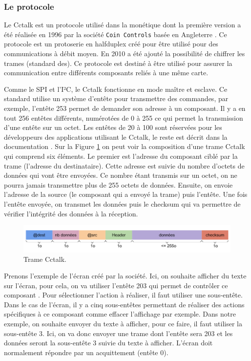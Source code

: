 \documentclass[a4paper]{article}
\begin{document}
\subsubsection{Le protocole}

Le Cctalk est un protocole utilisé dans la monétique dont la première version a
été réalisée en 1996 par la société \verb|Coin Controls| basée en Angleterre
\cite{cctalkpt1}. Ce protocole est un \gls{protoserie} en \gls{halfduplex} créé
pour être utilisé pour des communications à débit moyen. En 2010 a été ajouté la
possibilité de chiffrer les trames (standard \gls{des}). Ce protocole est
destiné à être utilisé pour assurer la communication entre différents composants
reliés à une même carte.

Comme le SPI et l'I²C, le Cctalk fonctionne en mode maître et esclave. Ce
standard utilise un système d'entête pour transmettre des commandes, par
exemple, l'entête 253 permet de demander son adresse à un composant. Il y a en
tout 256 entêtes différents, numérotées de 0 à 255 ce qui permet la
transmission d'une entête sur un octet. Les entêtes de 20 à 100 sont réservées
pour les développeurs des applications utilisant le Cctalk, le reste est décrit
dans la documentation \cite{cctalkpt2}. Sur la Figure \ref{tramecctalk} on peut
voir la composition d'une trame Cctalk qui comprend six éléments. Le premier est
l'adresse du composant ciblé par la trame (l'adresse du destinataire). Cette
adresse est suivie du nombre d'octets de données qui vont être envoyées. Ce
nombre étant transmis sur un octet, on ne pourra jamais transmettre plus de 255
octets de données. Ensuite, on envoie l'adresse de la source (le composant qui a
envoyé la trame) puis l'entête. Une fois l'entête envoyée, on transmet les
données puis le checksum qui va permettre de vérifier l'intégrité des données à
la réception.

\begin{figure}[h!]
  \begin{center}
  \includegraphics[scale=0.4]{./img/trame-cctalk.png}
  \caption{Trame Cctalk.}
    \label{tramecctalk}
  \end{center}
\end{figure}

Prenons l'exemple de l'écran créé par la société. Ici, on souhaite afficher du
texte sur l'écran, pour cela, on va utiliser l'entête 203 qui permet de
contrôler ce composant \cite{cctalkpt2}. Pour sélectionner l'action à réaliser,
il faut utiliser une sous-entête. Dans le cas de l'écran, il y a cinq
sous-entêtes permettant de réaliser des actions spécifiques à ce composant comme
effacer l'affichage par exemple. Dans notre exemple, on souhaite envoyer du
texte à afficher, pour ce faire, il faut utiliser la sous-entête 3. Ici, on va
donc envoyer une trame dont l'entête sera 203 et les données seront la
sous-entête 3 suivie du texte à afficher. L'écran doit normalement répondre par
un acquittement (entête 0).
\end{document}
